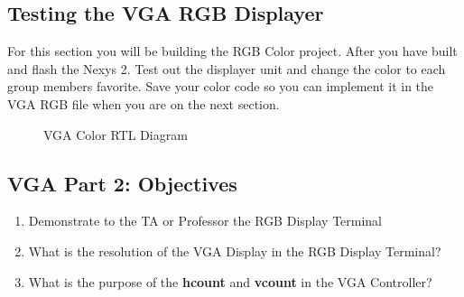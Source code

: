 \documentclass{article}
\begin{document}
% 
% 
% 

\subsection{Testing the VGA RGB Displayer}
For this section you will be building the RGB Color project. After you have built and flash the Nexys 2. Test out the displayer unit and change the color to each group members favorite. Save your color code so you can implement it in the VGA RGB file when you are on the next section.

\begin{figure}[!htbp]
  \centering
  \caption{VGA Color RTL Diagram}
\end{figure}

\subsection{VGA Part 2: Objectives}

\begin{enumerate}
  \item Demonstrate to the TA or Professor the RGB Display Terminal
  \item What is the resolution of the VGA Display in the RGB Display Terminal?
  \item What is the purpose of the \textbf{hcount} and \textbf{vcount} in the VGA Controller?
\end{enumerate}
\end{document}
